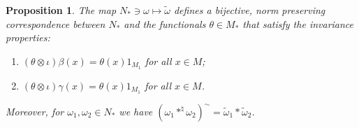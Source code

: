 \documentclass[pdftex]{sigma}
\numberwithin{equation}{section}
\newtheorem{prop}[thm]{Proposition}
\theoremstyle{definition}
\begin{document}
\begin{prop}\label{PropInvariance}
 The map $N_\ast \ni \omega \mapsto \tilde{\omega}$ defines a bijective, norm preserving correspondence between $N_\ast$ and the   functionals $\theta \in M_\ast$ that satisfy the invariance properties:
\begin{enumerate}\itemsep=0pt
 \item\label{LemInvarianceI} $(\theta \otimes \iota) \beta(x) = \theta(x) 1_{M_1}$ for all $x \in M$;
\item\label{LemInvarianceII} $(\theta \otimes \iota) \gamma(x) = \theta(x) 1_{M_1}$ for all $x \in M$.
\end{enumerate}
Moreover, for $\omega_1, \omega_2 \in N_\ast$ we have $ \left( \omega_1 \ast^\natural \omega_2 \right)^\sim = \tilde{\omega}_1 \ast \tilde{\omega}_2$.
\end{prop}
\end{document}
